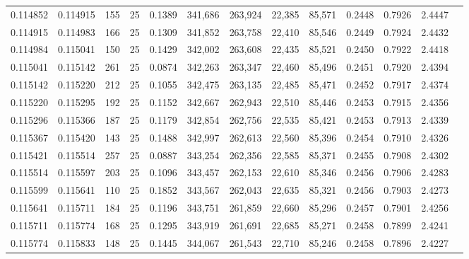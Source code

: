 \begin{tabular}{rrrrrrrrrrrrr}
0.114852 & 0.114915 &   155 &  25 &                                     0.1389 & 341,686 & 263,924 &  22,385 &  85,571 & 0.2448 & 0.7926 & 2.4447 \\
0.114915 & 0.114983 &   166 &  25 &                                     0.1309 & 341,852 & 263,758 &  22,410 &  85,546 & 0.2449 & 0.7924 & 2.4432 \\
0.114984 & 0.115041 &   150 &  25 &                                     0.1429 & 342,002 & 263,608 &  22,435 &  85,521 & 0.2450 & 0.7922 & 2.4418 \\
0.115041 & 0.115142 &   261 &  25 &                                     0.0874 & 342,263 & 263,347 &  22,460 &  85,496 & 0.2451 & 0.7920 & 2.4394 \\
0.115142 & 0.115220 &   212 &  25 &                                     0.1055 & 342,475 & 263,135 &  22,485 &  85,471 & 0.2452 & 0.7917 & 2.4374 \\
0.115220 & 0.115295 &   192 &  25 &                                     0.1152 & 342,667 & 262,943 &  22,510 &  85,446 & 0.2453 & 0.7915 & 2.4356 \\
0.115296 & 0.115366 &   187 &  25 &                                     0.1179 & 342,854 & 262,756 &  22,535 &  85,421 & 0.2453 & 0.7913 & 2.4339 \\
0.115367 & 0.115420 &   143 &  25 &                                     0.1488 & 342,997 & 262,613 &  22,560 &  85,396 & 0.2454 & 0.7910 & 2.4326 \\
0.115421 & 0.115514 &   257 &  25 &                                     0.0887 & 343,254 & 262,356 &  22,585 &  85,371 & 0.2455 & 0.7908 & 2.4302 \\
0.115514 & 0.115597 &   203 &  25 &                                     0.1096 & 343,457 & 262,153 &  22,610 &  85,346 & 0.2456 & 0.7906 & 2.4283 \\
0.115599 & 0.115641 &   110 &  25 &                                     0.1852 & 343,567 & 262,043 &  22,635 &  85,321 & 0.2456 & 0.7903 & 2.4273 \\
0.115641 & 0.115711 &   184 &  25 &                                     0.1196 & 343,751 & 261,859 &  22,660 &  85,296 & 0.2457 & 0.7901 & 2.4256 \\
0.115711 & 0.115774 &   168 &  25 &                                     0.1295 & 343,919 & 261,691 &  22,685 &  85,271 & 0.2458 & 0.7899 & 2.4241 \\
0.115774 & 0.115833 &   148 &  25 &                                     0.1445 & 344,067 & 261,543 &  22,710 &  85,246 & 0.2458 & 0.7896 & 2.4227 \\

\end{tabular}
